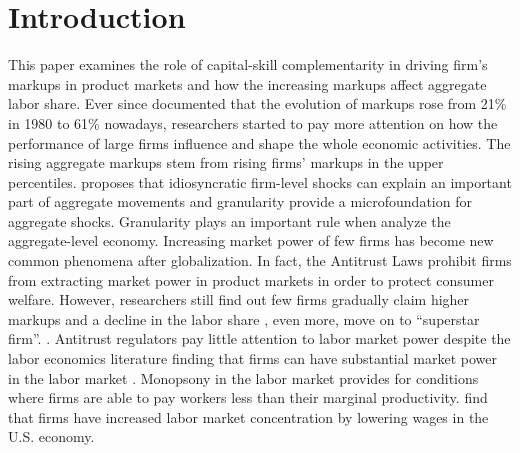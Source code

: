 \documentclass[12pt]{article}
\begin{document}
\section{Introduction} \label{sec:introduction}
This paper examines the role of capital-skill complementarity in driving firm’s markups in product markets and how the increasing markups affect aggregate labor share. Ever since \citet{de2017rise} documented that the evolution of markups rose from 21\% in 1980 to 61\% nowadays,  researchers started to pay more attention on how the performance of large firms influence and shape the whole economic activities. The rising aggregate markups stem from rising firms' markups in the upper percentiles. \citet{gabaix2011granular} proposes that idiosyncratic firm-level shocks can explain an important part of aggregate movements and granularity provide a microfoundation for aggregate shocks. Granularity plays an important rule when analyze the aggregate-level economy. Increasing market power of few firms has become new common phenomena after globalization. In fact, the Antitrust Laws prohibit firms from extracting  market power in product markets in order to protect consumer welfare. However, researchers still find out few firms gradually claim higher markups \citep{de2018global} and a decline in the labor share \citep{autor2017fall}, even more, move on to “superstar firm”. \citep{autor2017dp11810}. Antitrust regulators pay little attention to labor market power despite the labor economics literature finding that firms can have substantial market power in the labor market \citep{staiger2010there,falch2010elasticity,ransom2010estimating}. Monopsony in the labor market provides for conditions where firms are able to pay workers less than their marginal productivity. \citet{autor2017fall} find that firms have increased labor market concentration by lowering wages in the U.S. economy.
\end{document}
